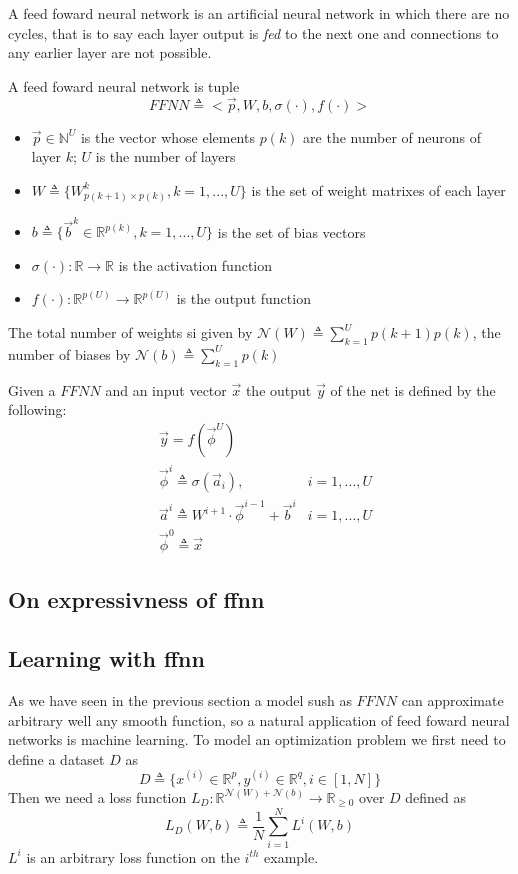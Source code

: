 
A feed foward neural network is an artificial neural network in which there are no cycles, that is to say each layer output is \textit{fed} to the next one and connections to any earlier layer are not possible. 


\begin{defn}
\label{def_ffnn}
A feed foward neural network is tuple
$$FFNN\triangleq<\vec{p},W,b,\sigma(\cdot),f(\cdot)>$$
\begin{itemize}
 \item $\vec{p} \in \mathbb{N}^U$ is the vector whose elements $p(k)$ are the number of neurons of layer $k$; $U$ is the number of layers
 \item $W\triangleq \{W^k_{p(k+1) \times p(k)}, k=1,...,U \}$ is the set of weight matrixes of each layer
 \item $b \triangleq \{\vec{b}^k \in \mathbb{R}^{p(k)}, k=1,...,U \} $ is the set of bias vectors
 \item $\sigma(\cdot): \mathbb{R}\rightarrow \mathbb{R}$ is the activation function
 \item $f(\cdot): \mathbb{R}^{p(U)}\rightarrow \mathbb{R}^{p(U)}$ is the output function
\end{itemize}
The total number of weights si given by $\mathcal{N}(W) \triangleq \sum_{k=1}^U p(k+1)p(k)$, the number of biases by $\mathcal{N}(b) \triangleq \sum_{k=1}^U p(k)$
\end{defn}

Given a $FFNN$ and an input vector $\vec{x}$ the output $\vec{y}$ of the net is defined by the following:
\begin{align}
&\vec{y}=f(\vec{\phi}^{U}) &\\
&\vec{\phi}^{i} \triangleq \sigma(\vec{a}_{i}), & i=1,...,U\\
&\vec{a}^{i} \triangleq W^{i+1} \cdot \vec{\phi}^{i-1} +\vec{b}^i  & i=1,...,U\\
&\vec{\phi}^{0} \triangleq \vec{x} &
\end{align}


\subsection{On expressivness of ffnn}
\subsection{Learning with ffnn}

As we have seen in the previous section a model sush as $FFNN$ can approximate arbitrary well any smooth function, so a natural application of feed foward neural networks is machine learning.
To model an optimization problem we first need to define a dataset $D$ as 
\begin{equation}
D\triangleq\{x^{(i)} \in \mathbb{R}^p, y^{(i)} \in \mathbb{R}^q,  i\in[1,N]\}
\end{equation}
Then we need a loss function $L_D:\mathbb{R}^{\mathcal{N}(W)+\mathcal{N}(b)} \rightarrow \mathbb{R}_{\geq 0}$ over $D$ defined as
\begin{equation}
L_D(W,b)\triangleq\frac{1}{N}\sum_{i=1}^N L^i(W,b) 
\end{equation}
$L^i$ is an arbitrary loss function on the $i^{th}$ example.


